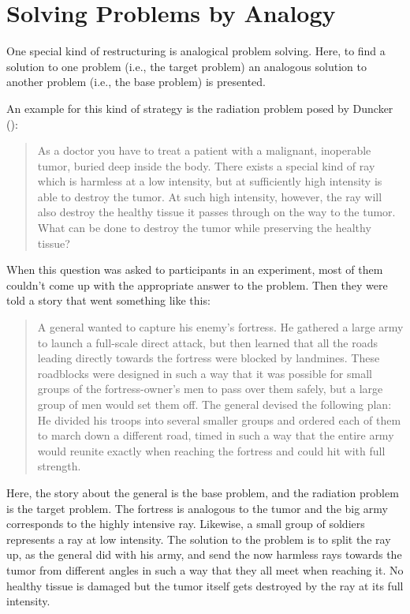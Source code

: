 \documentclass[
]{krantz}
\begin{document}
\section{Solving Problems by Analogy}\label{solving-problems-by-analogy}

One special kind of restructuring is analogical problem solving. Here, to find a solution to one problem (i.e., the target problem) an analogous solution to another problem (i.e., the base problem) is presented.

An example for this kind of strategy is the radiation problem posed by Duncker ():

\begin{quote}
As a doctor you have to treat a patient with a malignant, inoperable tumor, buried deep inside the body. There exists a special kind of ray which is harmless at a low intensity, but at sufficiently high intensity is able to destroy the tumor. At such high intensity, however, the ray will also destroy the healthy tissue it passes through on the way to the tumor. What can be done to destroy the tumor while preserving the healthy tissue?
\end{quote}

When this question was asked to participants in an experiment, most of them couldn't come up with the appropriate answer to the problem. Then they were told a story that went something like this:

\begin{quote}
A general wanted to capture his enemy's fortress. He gathered a large army to launch a full-scale direct attack, but then learned that all the roads leading directly towards the fortress were blocked by landmines. These roadblocks were designed in such a way that it was possible for small groups of the fortress-owner's men to pass over them safely, but a large group of men would set them off. The general devised the following plan: He divided his troops into several smaller groups and ordered each of them to march down a different road, timed in such a way that the entire army would reunite exactly when reaching the fortress and could hit with full strength.
\end{quote}

Here, the story about the general is the base problem, and the radiation problem is the target problem. The fortress is analogous to the tumor and the big army corresponds to the highly intensive ray. Likewise, a small group of soldiers represents a ray at low intensity. The solution to the problem is to split the ray up, as the general did with his army, and send the now harmless rays towards the tumor from different angles in such a way that they all meet when reaching it. No healthy tissue is damaged but the tumor itself gets destroyed by the ray at its full intensity.
\end{document}
